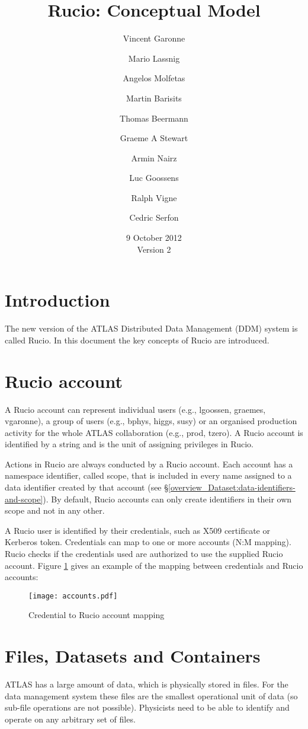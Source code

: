 \documentclass{atlasnote}
\title{Rucio: Conceptual Model}
\author[1]{Vincent Garonne}
\author[1]{Mario Lassnig}
\author[1]{Angelos Molfetas}
\author[1]{Martin Barisits}
\author[1]{Thomas Beermann}
\author[1]{Graeme A Stewart}
\author[1]{Armin Nairz}
\author[1]{Luc Goossens}
\author[1]{Ralph Vigne}
\author[1]{Cedric Serfon}
\affil[1]{PH-ADP-CO, CERN}
\date{9 October 2012\\ Version 2}
\begin{document}
\section{Introduction}

The new version of the ATLAS Distributed Data Management (DDM) system is called Rucio. In this document the key concepts of Rucio are introduced.

\section{Rucio account}
\label{overview_Rucio_account:rucio-account}

A Rucio account can represent individual users (e.g., lgoossen, graemes, vgaronne), a group of users (e.g., bphys, higgs, susy) or an organised production activity for the whole ATLAS collaboration (e.g., prod, tzero). A Rucio account is identified by a string and is the unit of assigning privileges in Rucio.

Actions in Rucio are always conducted by a Rucio account. Each account has a namespace identifier, called scope, that is included in every name assigned to a data identifier created by that account (see \S \ref{overview_Dataset:data-identifiers-and-scope}). By default, Rucio accounts can only create identifiers in their own scope and not in any other.

A Rucio user is identified by their credentials, such as X509 certificate or Kerberos token. Credentials can map to one or more accounts (N:M mapping). Rucio checks if the credentials used are authorized to use the supplied Rucio account. Figure \ref{credentials} gives an example of the mapping between credentials and Rucio accounts:

\begin{figure}[ht]
\begin{center}
\texttt{[image: accounts.pdf]}
\end{center}
\caption{\label{credentials} Credential to Rucio account mapping}
\end{figure}

\section{Files, Datasets and Containers}
\label{overview_Dataset:dataset}

ATLAS has a large amount of data, which is physically stored in files. For the data management system these files are the smallest operational unit of data (so sub-file operations are not possible). Physicists need to be able to identify and operate on any arbitrary set of files.
\end{document}
